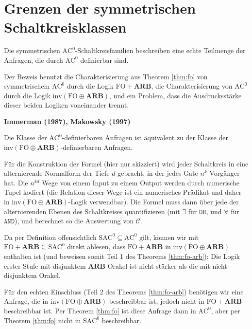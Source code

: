 
\chapter{Grenzen der symmetrischen Schaltkreisklassen}

Die symmetrischen $\mathrm{AC}^{0}$-Schaltkreisfamilien beschreiben
eine echte Teilmenge der Anfragen, die durch $\mathrm{AC}^{0}$ definierbar
sind.

Der Beweis benutzt die Charakterisierung aus Theorem \ref{thm:fo}
von symmetrischem $\mathrm{AC}^{0}$ durch die Logik $\mathrm{FO}+\mathbf{ARB}$,
die Charakterisierung von $\mathrm{AC}^{0}$ durch die Logik $\mathrm{inv}\left(\mathrm{FO}\oplus\mathbf{ARB}\right)$,
und ein Problem, dass die Ausdrucksstärke dieser beiden Logiken voneinander
trennt.
\begin{thm}
\textbf{\label{lem:fo-arb-ac0}Immerman (1987)}\cite{Immerman1987}\textbf{,
Makowsky (1997)\cite{Makowsky1997-FO}}

Die Klasse der $\mathrm{AC}^{0}$-definierbaren Anfragen ist äquivalent
zu der Klasse der $\mathrm{inv}\left(\mathrm{FO}\oplus\mathbf{ARB}\right)$-definierbaren
Anfragen.
\end{thm}
Für die Konstruktion der Formel (hier nur skizziert) wird jeder Schaltkreis
in eine alternierende Normalform der Tiefe $d$ gebracht, in der jedes
Gate $n^{k}$ Vorgänger hat. Die $n^{kd}$ Wege von einem Input zu
einem Output werden durch numerische Tupel kodiert (die Relation dieser
Wege ist ein numerisches Prädikat und daher in $\mathrm{inv}\left(\mathrm{FO}\oplus\mathbf{ARB}\right)$-Logik
verwendbar). Die Formel muss dann über jede der alternierenden Ebenen
des Schaltkreises quantifizieren (mit $\exists$ für $\mathtt{OR}$,
und $\forall$ für $\mathtt{AND}$), und berechnet so die Auswertung
von $\mathcal{C}$.

Da per Definition offensichtlich $\mathrm{SAC}^{0}\subseteq\mathrm{AC}^{0}$
gilt, können wir mit $\mathrm{FO}+\mathbf{ARB}\subseteq\mathrm{SAC}^{0}$
direkt ablesen, dass $\mathrm{FO}+\mathbf{ARB}$ in $\mathrm{inv}\left(\mathrm{FO}\oplus\mathbf{ARB}\right)$
enthalten ist (und beweisen somit Teil 1 des Theorems \ref{thm:fo-arb}):
Die Logik erster Stufe mit disjunktem $\mathbf{ARB}$-Orakel ist nicht
stärker als die mit nicht-disjunktem Orakel.

Für den echten Einschluss (Teil 2 des Theorems \ref{thm:fo-arb})
benötigen wir eine Anfrage, die in $\mathrm{inv}\left(\mathrm{FO}\oplus\mathbf{ARB}\right)$
beschreibbar ist, jedoch nicht in $\mathrm{FO}+\mathbf{ARB}$ beschreibbar
ist. Per Theorem \ref{thm:fo} ist diese Anfrage dann in $\mathrm{AC}^{0}$,
aber per Theorem \ref{thm:fo} nicht in $\mathrm{SAC}^{0}$ beschreibbar.

